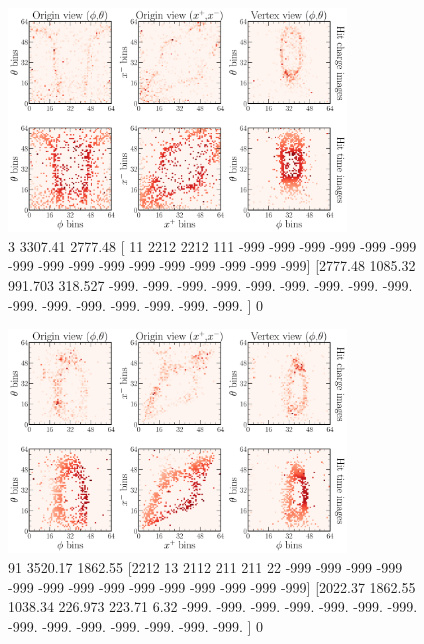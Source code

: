 \begin{figure} %
    \includegraphics[width=0.8\textwidth]{diagrams/6-cvn/chipsnet/explore_nuel_ccres_event.pdf}
    \caption[explore nuel ccres event short]
    {3
        3307.41
        2777.48
            [  11 2212 2212  111 -999 -999 -999 -999 -999 -999 -999 -999 -999 -999
                -999 -999 -999 -999 -999 -999]
            [2777.48  1085.32   991.703  318.527 -999.    -999.    -999.    -999.
                -999.    -999.    -999.    -999.    -999.    -999.    -999.    -999.
                -999.    -999.    -999.    -999.   ]
        0}
    \label{fig:explore_nuel_ccres_event}
\end{figure}

\begin{figure} %
    \includegraphics[width=0.8\textwidth]{diagrams/6-cvn/chipsnet/explore_numu_ccdis_event.pdf}
    \caption[explore numu ccdis event short]
    {91
        3520.17
        1862.55
            [2212   13 2112  211  211   22 -999 -999 -999 -999 -999 -999 -999 -999
                -999 -999 -999 -999 -999 -999]
            [2022.37  1862.55  1038.34   226.973  223.71     6.32  -999.    -999.
                -999.    -999.    -999.    -999.    -999.    -999.    -999.    -999.
                -999.    -999.    -999.    -999.   ]
        0}
    \label{fig:explore_numu_ccdis_event}
\end{figure}

